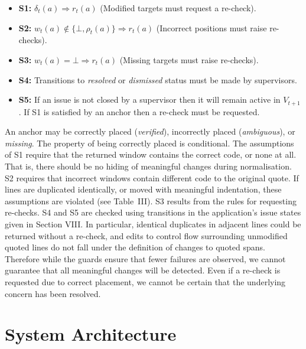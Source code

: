 \documentclass[10pt,conference,letterpaper]{IEEEtran}
\begin{document}
\begin{itemize}
\item \textbf{S1:} $\delta_t(a)\Rightarrow r_t(a)$ (Modified targets must request a re-check).
\item \textbf{S2:} $w_t(a)\notin\{\bot,\rho_t(a)\}\Rightarrow r_t(a)$ (Incorrect positions must raise re-checks).
\item \textbf{S3:} $w_t(a)=\bot\Rightarrow r_t(a)$ (Missing targets must raise re-checks).
\item \textbf{S4:} Transitions to \emph{resolved} or \emph{dismissed} status must be made by supervisors.
\item \textbf{S5:} If an issue is not closed by a supervisor then it will remain active in $V_{t+1}$. If S1 is satisfied by an anchor then a re-check must be requested.
\end{itemize}
An anchor may be correctly placed (\emph{verified}), incorrectly placed (\emph{ambiguous}), or \emph{missing}. The property of being correctly placed is conditional. The assumptions of S1 require that the returned window contains the correct code, or none at all. That is, there should be no hiding of meaningful changes during normalisation. S2 requires that incorrect windows contain different code to the original quote. If lines are duplicated identically, or moved with meaningful indentation, these assumptions are violated (see Table~III). S3 results from the rules for requesting re-checks. S4 and S5 are checked using transitions in the application’s issue states given in Section VIII. In particular, identical duplicates in adjacent lines could be returned without a re-check, and edits to control flow surrounding unmodified quoted lines do not fall under the definition of changes to quoted spans. Therefore while the guards ensure that fewer failures are observed, we cannot guarantee that all meaningful changes will be detected. Even if a re-check is requested due to correct placement, we cannot be certain that the underlying concern has been resolved.


\section{System Architecture}
\end{document}
